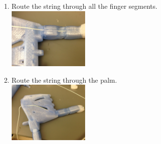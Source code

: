\documentclass[11pt]{article}
\begin{document}
\begin{enumerate}
\item Route the string through all the finger segments.\\ \includegraphics[width=4cm]{images/hand_assembly/String routing.jpg}
\item Route the string through the palm.\\ \includegraphics[width=4cm]{images/hand_assembly/String routing through palm.jpg}
\end{enumerate}

\newpage
\end{document}
